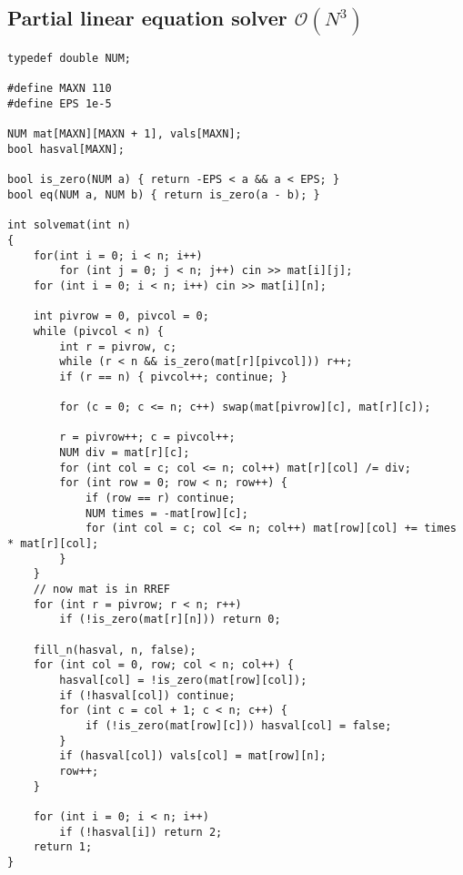 \documentclass{article}
\begin{document}
\subsection{Partial linear equation solver $\mathcal{O}(N^3)$}

\begin{lstlisting}
typedef double NUM;

#define MAXN 110
#define EPS 1e-5

NUM mat[MAXN][MAXN + 1], vals[MAXN];
bool hasval[MAXN];

bool is_zero(NUM a) { return -EPS < a && a < EPS; }
bool eq(NUM a, NUM b) { return is_zero(a - b); }

int solvemat(int n)
{
	for(int i = 0; i < n; i++)
		for (int j = 0; j < n; j++) cin >> mat[i][j];
	for (int i = 0; i < n; i++) cin >> mat[i][n];

	int pivrow = 0, pivcol = 0;
	while (pivcol < n) {
		int r = pivrow, c;
		while (r < n && is_zero(mat[r][pivcol])) r++;
		if (r == n) { pivcol++; continue; }

		for (c = 0; c <= n; c++) swap(mat[pivrow][c], mat[r][c]);

		r = pivrow++; c = pivcol++;
		NUM div = mat[r][c];
		for (int col = c; col <= n; col++) mat[r][col] /= div;
		for (int row = 0; row < n; row++) {
			if (row == r) continue;
			NUM times = -mat[row][c];
			for (int col = c; col <= n; col++) mat[row][col] += times * mat[r][col];
		}
	}
	// now mat is in RREF
	for (int r = pivrow; r < n; r++)
		if (!is_zero(mat[r][n])) return 0;

	fill_n(hasval, n, false);
	for (int col = 0, row; col < n; col++) {
		hasval[col] = !is_zero(mat[row][col]);
		if (!hasval[col]) continue;
		for (int c = col + 1; c < n; c++) {
			if (!is_zero(mat[row][c])) hasval[col] = false;
		}
		if (hasval[col]) vals[col] = mat[row][n];
		row++;
	}

	for (int i = 0; i < n; i++)
		if (!hasval[i]) return 2;
	return 1;
}
\end{lstlisting}
\end{document}
